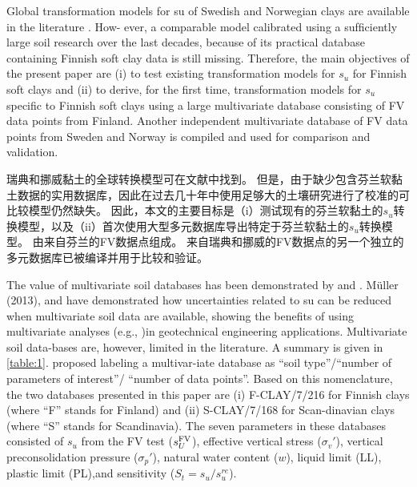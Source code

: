 \begin{paracol}{2}
    \switchcolumn*

    Global transformation models for su of Swedish and Norwegian clays are available in the literature \citep{Larsson1991,Larsson2007,Karlsrud20131273}. How- ever, a comparable model calibrated using a sufﬁciently large soil research over the last decades, because of its practical database containing Finnish soft clay data is still missing. Therefore, the main objectives of the present paper are (i) to test existing transformation models for $s_u$ for Finnish soft clays and (ii) to derive, for the ﬁrst time, transformation models for $s_u$ speciﬁc to Finnish soft clays using a large multivariate database consisting of FV data points from Finland. Another independent multivariate database of FV data points from Sweden and Norway is compiled and used for comparison and validation.

    \switchcolumn

    瑞典和挪威黏土的全球转换模型可在文献中找到\citep{Larsson1991,Larsson2007,Karlsrud20131273}。 但是，由于缺少包含芬兰软黏土数据的实用数据库，因此在过去几十年中使用足够大的土壤研究进行了校准的可比较模型仍然缺失。 因此，本文的主要目标是（i）测试现有的芬兰软黏土的$s_u$转换模型，以及（ii）首次使用大型多元数据库导出特定于芬兰软黏土的$s_u$转换模型。 由来自芬兰的FV数据点组成。 来自瑞典和挪威的FV数据点的另一个独立的多元数据库已被编译并用于比较和验证。

    \switchcolumn*

    The value of multivariate soil databases has been demonstrated by \citet{Ching201252,Ching2012522, Ching2013907,Ching2014663,Ching2014686} and \citet{Ching201477}. Müller (2013), \citet{Müller2014231,Müller2016603} and \citet{Prästings20161} have demonstrated how uncertainties related to su can be reduced when multivariate soil data are available, showing the beneﬁts of using multivariate analyses (e.g., \citealt{Ching201016})in geotechnical engineering applications. Multivariate soil data-bases are, however, limited in the literature. A summary is given in \autoref{table:1}. \citet{Ching2014663} proposed labeling a multivar-iate database as “soil type”/“number of parameters of interest”/ “number of data points”. Based on this nomenclature, the two databases presented in this paper are (i) F-CLAY/7/216 for Finnish clays (where “F” stands for Finland) and (ii) S-CLAY/7/168 for Scan-dinavian clays (where “S” stands for Scandinavia). The seven parameters in these databases consisted of $s_u$ from the FV test ($s_U^{\rm{FV}}$), effective vertical stress ($\sigma_v'$), vertical preconsolidation pressure ($\sigma_p'$), natural water content ($w$), liquid limit (LL), plastic limit (PL),and sensitivity ($S_t=s_u/s_u^{re}$).


\end{paracol}
